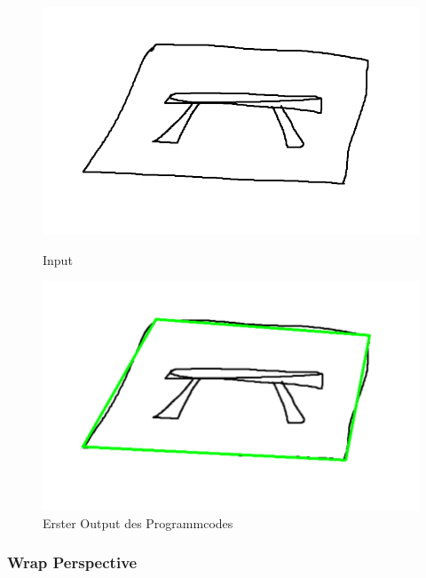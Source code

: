 \begin{figure}[htb]
    \centering
    \begin{minipage}[t]{0.45\linewidth}
        \centering
        \includegraphics[width=\linewidth]{pics/bildverarbeitungsalgos/ApproxPolyDP_input.png}
        \caption{Input}
        \label{maai:approxpolydp:input}
    \end{minipage}
    \hfill
    \begin{minipage}[t]{0.45\linewidth}
        \centering
        \includegraphics[width=\linewidth]{pics/bildverarbeitungsalgos/ApproxPolyDP_output.png}
        \caption{Erster Output des Programmcodes}
        \label{maai:approxpolydp:output}
    \end{minipage}
\end{figure}


\subsubsection{Wrap Perspective}\label{maai:wrapPerspective}

